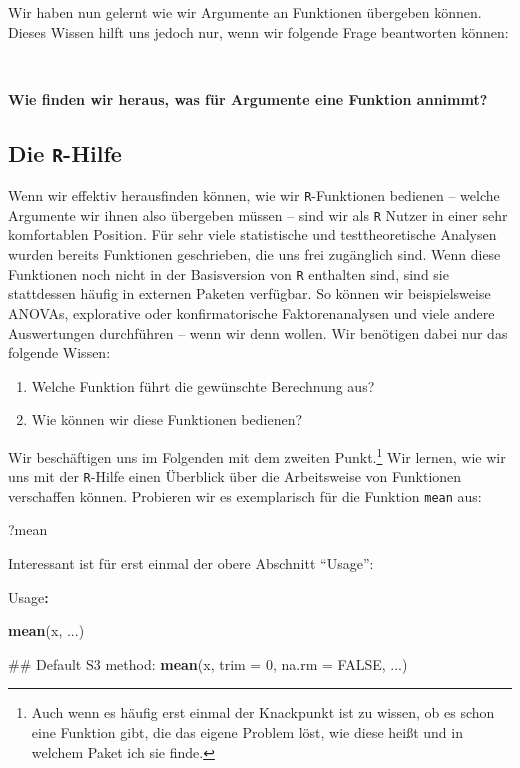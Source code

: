 \documentclass[12pt,]{tufte-book}
\newenvironment{Shaded}{\begin{snugshade}}{\end{snugshade}}
\newcommand{\KeywordTok}[1]{\textcolor[rgb]{0.13,0.29,0.53}{\textbf{#1}}}
\newcommand{\DataTypeTok}[1]{\textcolor[rgb]{0.13,0.29,0.53}{#1}}
\newcommand{\DecValTok}[1]{\textcolor[rgb]{0.00,0.00,0.81}{#1}}
\newcommand{\StringTok}[1]{\textcolor[rgb]{0.31,0.60,0.02}{#1}}
\newcommand{\OtherTok}[1]{\textcolor[rgb]{0.56,0.35,0.01}{#1}}
\newcommand{\OperatorTok}[1]{\textcolor[rgb]{0.81,0.36,0.00}{\textbf{#1}}}
\newcommand{\NormalTok}[1]{#1}
\providecommand{\tightlist}{%
  \setlength{\itemsep}{0pt}\setlength{\parskip}{0pt}}
\theoremstyle{definition}
\theoremstyle{definition}
\theoremstyle{definition}
\theoremstyle{remark}
\begin{document}
Wir haben nun gelernt wie wir Argumente an Funktionen übergeben können.
Dieses Wissen hilft uns jedoch nur, wenn wir folgende Frage beantworten
können:

~

\textbf{Wie finden wir heraus, was für Argumente eine Funktion annimmt?}

\subsection{\texorpdfstring{Die
\texttt{R}-Hilfe}{Die R-Hilfe}}\label{help}

Wenn wir effektiv herausfinden können, wie wir \texttt{R}-Funktionen
bedienen -- welche Argumente wir ihnen also übergeben müssen -- sind wir
als \texttt{R} Nutzer in einer sehr komfortablen Position. Für sehr
viele statistische und testtheoretische Analysen wurden bereits
Funktionen geschrieben, die uns frei zugänglich sind. Wenn diese
Funktionen noch nicht in der Basisversion von \texttt{R} enthalten sind,
sind sie stattdessen häufig in externen Paketen verfügbar. So können wir
beispielsweise ANOVAs, explorative oder konfirmatorische
Faktorenanalysen und viele andere Auswertungen durchführen -- wenn wir
denn wollen. Wir benötigen dabei nur das folgende Wissen:

\begin{enumerate}
\def\labelenumi{\arabic{enumi}.}
\tightlist
\item
  Welche Funktion führt die gewünschte Berechnung aus?
\item
  Wie können wir diese Funktionen bedienen?
\end{enumerate}

Wir beschäftigen uns im Folgenden mit dem zweiten Punkt.\footnote{Auch
  wenn es häufig erst einmal der Knackpunkt ist zu wissen, ob es schon
  eine Funktion gibt, die das eigene Problem löst, wie diese heißt und
  in welchem Paket ich sie finde.} Wir lernen, wie wir uns mit der
\texttt{R}-Hilfe einen Überblick über die Arbeitsweise von Funktionen
verschaffen können. Probieren wir es exemplarisch für die Funktion
\texttt{mean} aus:

\begin{Shaded}
\begin{Highlighting}[]
\NormalTok{?mean}
\end{Highlighting}
\end{Shaded}

Interessant ist für erst einmal der obere Abschnitt ``Usage'':

\begin{Shaded}
\begin{Highlighting}[]
\NormalTok{Usage}\OperatorTok{:}

\StringTok{    }\KeywordTok{mean}\NormalTok{(x, ...)}

\NormalTok{    ## Default S3 method:}
    \KeywordTok{mean}\NormalTok{(x, }\DataTypeTok{trim =} \DecValTok{0}\NormalTok{, }\DataTypeTok{na.rm =} \OtherTok{FALSE}\NormalTok{, ...)}
\end{Highlighting}
\end{Shaded}
\end{document}
